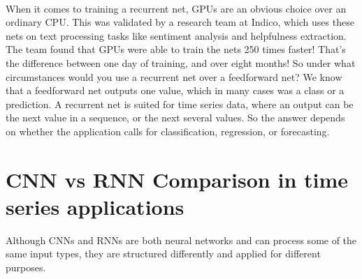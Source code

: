 \documentclass{article}
\begin{document}
    \paragraph{}
    When it comes to training a recurrent net,  GPUs are an obvious choice over an ordinary  CPU. This was validated by a research team  at Indico, which uses these nets on text processing  tasks like sentiment analysis and helpfulness  extraction. The team found that GPUs were  able to train the nets 250 times faster! That’s  the difference between one day of training,  and over eight months!  So under what circumstances would you use  a recurrent net over a feedforward net? We  know that a feedforward net outputs one value,  which in many cases was a class or a prediction.  A recurrent net is suited for time series  data, where an output can be the next value  in a sequence, or the next several values.  So the answer depends on whether the application  calls for classification, regression, or forecasting.

    \newpage
    \section{CNN vs RNN Comparison in time series applications}
    Although CNNs and RNNs are both neural networks and can process some of the same input types, they are structured differently and applied for different purposes.
\end{document}
